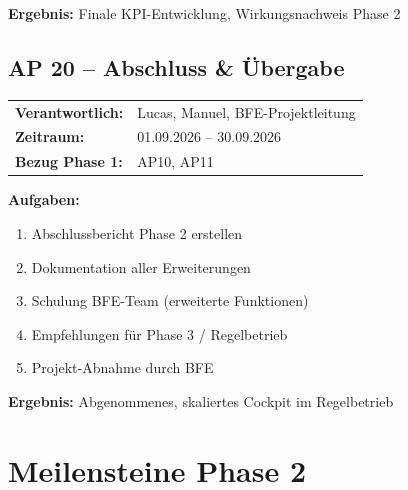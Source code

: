 \documentclass[11pt,a4paper]{article}
\begin{document}
\textbf{Ergebnis:} Finale KPI-Entwicklung, Wirkungsnachweis Phase 2

\subsection{AP 20 -- Abschluss \& Übergabe}

\begin{tabular}{ll}
\textbf{Verantwortlich:} & Lucas, Manuel, BFE-Projektleitung\\
\textbf{Zeitraum:} & 01.09.2026 -- 30.09.2026\\
\textbf{Bezug Phase 1:} & AP10, AP11\\
\end{tabular}

\textbf{Aufgaben:}
\begin{enumerate}[label=AP20.\arabic*]
    \item Abschlussbericht Phase 2 erstellen
    \item Dokumentation aller Erweiterungen
    \item Schulung BFE-Team (erweiterte Funktionen)
    \item Empfehlungen für Phase 3 / Regelbetrieb
    \item Projekt-Abnahme durch BFE
\end{enumerate}

\textbf{Ergebnis:} Abgenommenes, skaliertes Cockpit im Regelbetrieb

\newpage

\section{Meilensteine Phase 2}
\end{document}
